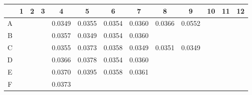 \documentclass[UTF8,10pt,a4paper,fontset=fandol]{ctexart}
\renewcommand{\arraystretch}{1.15}
\newcommand{\fieldvalue}[1]{#1}
\begin{document}
\begin{center}
\scriptsize
\renewcommand{\arraystretch}{1.55}
\begin{tabular}{c|c|c|c|c|c|c|c|c|c|c|c|c}
 &1&2&3&4&5&6&7&8&9&10&11&12\\ \hline
A&&&&
\fieldvalue{0.0349}&
\fieldvalue{0.0355}&
\fieldvalue{0.0354}&
\fieldvalue{0.0360}&
\fieldvalue{0.0366}&
\fieldvalue{0.0552}&\\ \hline
B&&&&
\fieldvalue{0.0357}&
\fieldvalue{0.0349}&
\fieldvalue{0.0354}&
\fieldvalue{0.0360}&&&\\ \hline
C&&&&
\fieldvalue{0.0355}&
\fieldvalue{0.0373}&
\fieldvalue{0.0358}&
\fieldvalue{0.0349}&
\fieldvalue{0.0351}&
\fieldvalue{0.0349}&\\ \hline
D&&&&
\fieldvalue{0.0366}&
\fieldvalue{0.0378}&
\fieldvalue{0.0354}&
\fieldvalue{0.0360}&&&\\ \hline
E&&&&
\fieldvalue{0.0370}&
\fieldvalue{0.0395}&
\fieldvalue{0.0358}&
\fieldvalue{0.0361}&&&\\ \hline
F&&&&
\fieldvalue{0.0373}&

\end{tabular}
\end{center}
\end{document}
